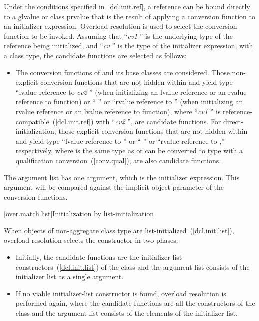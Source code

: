 \pnum
Under the conditions specified in~\ref{dcl.init.ref}, a reference can be bound directly
to a glvalue or class prvalue that is the result of applying a conversion
function to an initializer expression.
Overload resolution is used to select the
conversion function to be invoked.
Assuming that ``\textit{cv1} '' is the
underlying type of the reference being initialized, and
``\textit{cv} '' is the type
of the initializer expression, with
a class type,
the candidate functions are selected as follows:
\begin{itemize}
\item
The conversion functions of
and its base classes are considered.
Those non-explicit conversion functions that are not hidden within
and yield type ``lvalue reference to \textit{cv2} ''
(when initializing an lvalue reference or an rvalue reference to function) or
`` ''
or ``rvalue reference to  '' (when initializing an
rvalue reference or an lvalue reference to function),
where ``\textit{cv1} '' is reference-compatible~(\ref{dcl.init.ref})
with ``\textit{cv2} '',
are candidate functions. For direct-initialization, those explicit
conversion functions that are not hidden within  and yield
type ``lvalue reference to  '' or ``
'' or ``rvalue reference to  ,''
respectively, where  is the same type as  or can be
converted to type  with a qualification
conversion~(\ref{conv.qual}), are also candidate functions.

\end{itemize}

\pnum
The argument list has one argument, which is the initializer expression.
\enternote
This argument will be compared against
the implicit object parameter of the conversion functions.
\exitnote

[over.match.list]{Initialization by list-initialization}%

\pnum
When objects of non-aggregate class type  are
list-initialized~(\ref{dcl.init.list}), overload resolution selects the
constructor in two phases:

\begin{itemize}
\item
Initially, the candidate functions are the initializer-list constructors~(\ref{dcl.init.list})
of the class  and
the argument list consists of the initializer list as a single argument.

\item
If no viable initializer-list constructor is found, overload resolution is
performed again, where the candidate functions are all the constructors of
the class  and
the argument list consists of the elements of the initializer list.
\end{itemize}%
%

